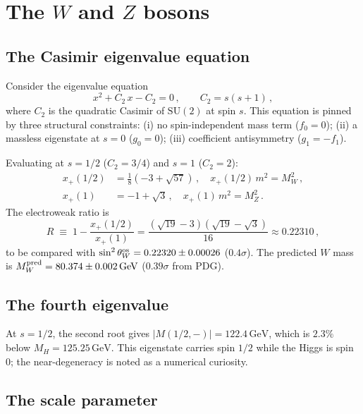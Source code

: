\documentclass[12pt,a4paper]{article}
\newcommand{\SU}{\mathrm{SU}}
\newcommand{\GeV}{\,\mathrm{GeV}}
\begin{document}
\section{The $W$ and $Z$ bosons}
\label{sec:WZ}

\subsection{The Casimir eigenvalue equation}

Consider the eigenvalue equation
\begin{equation}
  x^2 + C_2\,x - C_2 = 0\,,
  \qquad C_2 = s(s{+}1)\,,
  \label{eq:casimir}
\end{equation}
where $C_2$ is the quadratic Casimir of $\SU(2)$ at spin $s$.
This equation is pinned by three structural constraints:
(i) no spin-independent mass term ($f_0 = 0$);
(ii) a massless eigenstate at $s = 0$ ($g_0 = 0$);
(iii) coefficient antisymmetry ($g_1 = -f_1$).

Evaluating at $s = 1/2$ ($C_2 = 3/4$) and $s = 1$ ($C_2 = 2$):
\begin{align}
  x_+(1/2) &= \tfrac{1}{8}(-3 + \sqrt{57})\,,
  \quad x_+(1/2)\,m^2 = M_W^2\,,\\
  x_+(1) &= -1 + \sqrt{3}\,,
  \quad x_+(1)\,m^2 = M_Z^2\,.
\end{align}
The electroweak ratio is
\begin{equation}
  R \;\equiv\; 1 - \frac{x_+(1/2)}{x_+(1)}
  = \frac{(\sqrt{19} - 3)(\sqrt{19} - \sqrt{3})}{16}
  \approx 0.22310\,,
  \label{eq:sin2}
\end{equation}
to be compared with
$\sin^2\theta_W^{\rm os} = 0.22320 \pm 0.00026$ ($0.4\sigma$).
The predicted $W$ mass is
$M_W^{\rm pred} = 80.374 \pm 0.002\GeV$ ($0.39\sigma$ from PDG).

\subsection{The fourth eigenvalue}

At $s = 1/2$, the second root gives
$|M(1/2, -)| = 122.4\GeV$, which is $2.3\%$ below
$M_H = 125.25\GeV$.
This eigenstate carries spin $1/2$ while the Higgs is spin $0$;
the near-degeneracy is noted as a numerical curiosity.

\subsection{The scale parameter}
\end{document}
